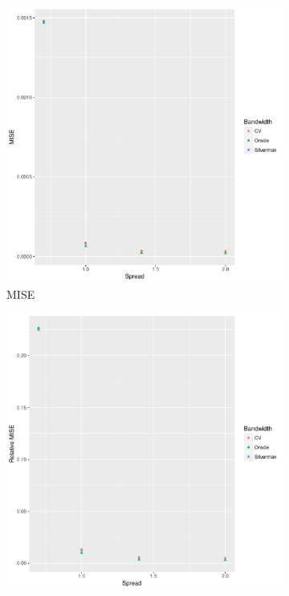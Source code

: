 \begin{figure}[htbp]
    \centering
    \begin{subfigure}[b]{0.3\textwidth}
    \includegraphics[width=\textwidth]{results/by_population_spread/MISE-vs-population-spread}
    \caption{MISE}
    \end{subfigure}
    \begin{subfigure}[b]{0.3\textwidth}
    \includegraphics[width=\textwidth]{results/by_population_spread/RMISE-vs-population-spread}

\end{subfigure}
\end{figure}
